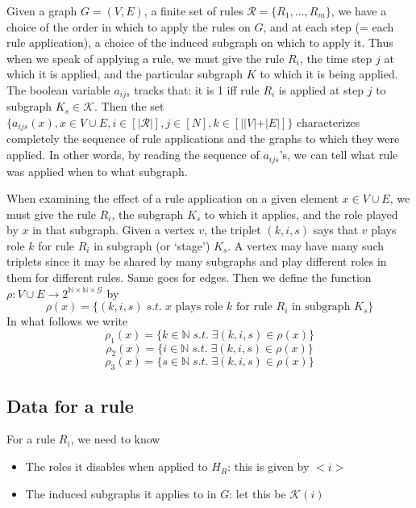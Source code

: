 \documentclass[11pt, oneside, reqno]{article}
\newcommand{\Gc}{\mathcal{G}}
\newcommand{\Kc}{\mathcal{K}}
\newcommand{\Ne}{\mathbb{N}}
\newcommand{\Rc}{\mathcal{R}}
\begin{document}
Given a graph $G = (V,E)$, a finite set of rules $\Rc = \{R_1,\ldots,R_m\}$, we have a choice of the order in which to apply the rules on $G$, and at each step (= each rule application), a choice of the induced subgraph on which to apply it.
Thus when we speak of applying a rule, we must give the rule $R_i$, the time step $j$ at which it is applied, and the particular subgraph $K$ to which it is being applied.
The boolean variable $a_{ijs}$ tracks that: it is 1 iff rule $R_i$ is applied at step $j$ to subgraph $K_s \in \Kc$.
Then the set $\{a_{ijs}(x), x \in V \cup E, i \in [|\Rc|], j \in [N], k \in [||V|+|E|]\}$ characterizes completely the sequence of rule applications and the graphs to which they were applied.
In other words, by reading the sequence of $a_{ijs}$'s, we can tell what rule was applied when to what subgraph.

When examining the effect of a rule application on a given element $x \in V \cup E$, we must give the rule $R_i$, the subgraph $K_s$ to which it applies, and the role played by $x$ in that subgraph.
Given a vertex $v$, the triplet $(k,i,s)$ says that $v$ plays role $k$ for rule $R_i$ in subgraph (or `stage') $K_s$.
A vertex may have many such triplets since it may be shared by many subgraphs and play different roles in them for different rules.
Same goes for edges.
Then we define the function $\rho: V \cup E \rightarrow 2^{\Ne \times \Ne \times \Gc}$ by 
\begin{equation}
\rho(x) = \{(k,i,s) \; s.t. \; x \textrm{ plays role $k$ for rule $R_i$ in subgraph }K_s\}
\end{equation}
In what follows we write
\[\rho_1(x) = \{k \in \Ne \; s.t. \; \exists (k,i,s) \in \rho(x)\}\]
\[\rho_2(x) = \{i \in \Ne \; s.t. \; \exists (k,i,s) \in \rho(x)\}\]
\[\rho_3(x) = \{s \in \Ne \; s.t. \; \exists (k,i,s) \in \rho(x)\}\]

\subsection{Data for a rule}
For a rule $R_i$, we need to know
\begin{itemize}
	\item The roles it disables when applied to $H_R$: this is given by $<i>$
	\item The induced subgraphs it applies to in $G$: let this be $\Kc(i)$
\end{itemize}
\end{document}
